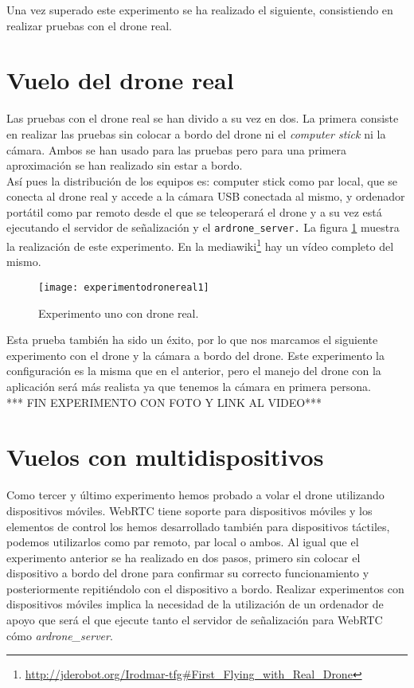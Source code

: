 Una vez superado este experimento se ha realizado el siguiente, consistiendo en realizar pruebas con el drone real.\\

\section{Vuelo del drone real}

Las pruebas con el drone real se han divido a su vez en dos. La primera consiste en realizar las pruebas sin colocar a bordo del drone ni el \emph{computer stick} ni la cámara. Ambos se han usado para las pruebas pero para una primera aproximación se han realizado sin estar a bordo.\\

Así pues la distribución de los equipos es: computer stick como par local, que se conecta al drone real y accede a la cámara USB conectada al mismo, y ordenador portátil como par remoto desde el que se teleoperará el drone y a su vez está ejecutando el servidor de señalización y el \texttt{ardrone\_server.} La figura \ref{fig:experimentodronereal1} muestra la realización de este experimento. En la mediawiki\footnote{\url{http://jderobot.org/Irodmar-tfg\#First\_Flying\_with\_Real\_Drone}}\cite{Mediawiki} hay un vídeo completo del mismo.\\

\begin{figure}[h!]
\centering
\texttt{[image: experimentodronereal1]}
\caption{Experimento uno con drone real.}
\label{fig:experimentodronereal1}
\end{figure}

Esta prueba también ha sido un éxito, por lo que nos marcamos el siguiente experimento con el drone y la cámara a bordo del drone. Este experimento la configuración es la misma que en el anterior, pero el manejo del drone con la aplicación será más realista ya que tenemos la cámara en primera persona.\\

*** FIN EXPERIMENTO CON FOTO Y LINK AL VIDEO***


\section{Vuelos con multidispositivos}

Como tercer y último experimento hemos probado a volar el drone utilizando dispositivos móviles. WebRTC tiene soporte para dispositivos móviles y los elementos de control los hemos desarrollado también para dispositivos táctiles, podemos utilizarlos como par remoto, par local o ambos. Al igual que el experimento anterior se ha realizado en dos pasos, primero sin colocar el dispositivo a bordo del drone para confirmar su correcto funcionamiento y posteriormente repitiéndolo con el dispositivo a bordo. Realizar experimentos con dispositivos móviles implica la necesidad de la utilización de un ordenador de apoyo que será el que ejecute tanto el servidor de señalización para WebRTC cómo \emph{ardrone\_server}.\\

